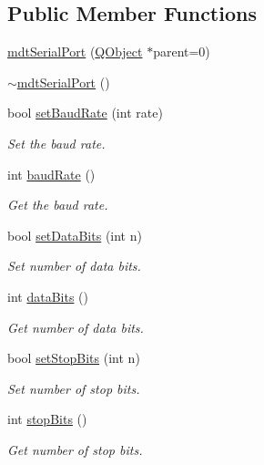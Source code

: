 \subsection*{Public Member Functions}
\begin{DoxyCompactItemize}
\item 
\hyperlink{classmdt_serial_port_a7b2da083885e727981c1fd4414634cae}{mdt\-Serial\-Port} (\hyperlink{class_q_object}{Q\-Object} $\ast$parent=0)
\item 
\hyperlink{classmdt_serial_port_a7149994f7b5eac8a13cfe57b465e1901}{$\sim$mdt\-Serial\-Port} ()
\item 
bool \hyperlink{classmdt_serial_port_ad77b6a5fd819fae6db0db888b3113351}{set\-Baud\-Rate} (int rate)
\begin{DoxyCompactList}\small\item\em Set the baud rate. \end{DoxyCompactList}\item 
int \hyperlink{classmdt_serial_port_ab7d9433433f4ec5d5e584721e5bb1195}{baud\-Rate} ()
\begin{DoxyCompactList}\small\item\em Get the baud rate. \end{DoxyCompactList}\item 
bool \hyperlink{classmdt_serial_port_af39774b2d3c4121623253740660a0389}{set\-Data\-Bits} (int n)
\begin{DoxyCompactList}\small\item\em Set number of data bits. \end{DoxyCompactList}\item 
int \hyperlink{classmdt_serial_port_a65c92bdb5543c1fe0034169ffc88d09f}{data\-Bits} ()
\begin{DoxyCompactList}\small\item\em Get number of data bits. \end{DoxyCompactList}\item 
bool \hyperlink{classmdt_serial_port_a9471ebff90de41decee977566dd1571f}{set\-Stop\-Bits} (int n)
\begin{DoxyCompactList}\small\item\em Set number of stop bits. \end{DoxyCompactList}\item 
int \hyperlink{classmdt_serial_port_a163a83bdcac2c81a5c6b097c4afde41f}{stop\-Bits} ()
\begin{DoxyCompactList}\small\item\em Get number of stop bits. \end{DoxyCompactList}\item 

\end{DoxyCompactItemize}
